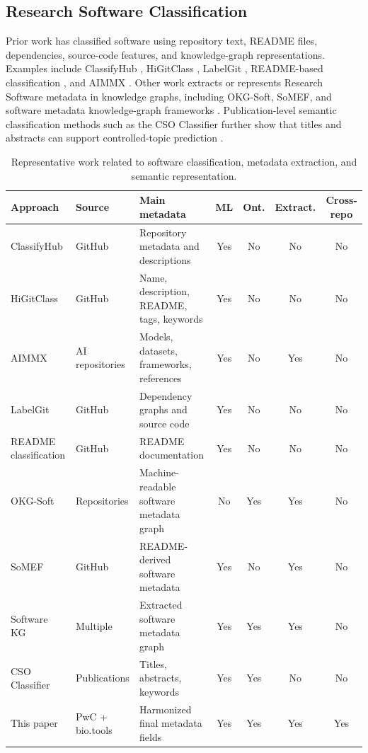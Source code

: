 \documentclass[pdflatex,sn-mathphys-num]{sn-jnl}
\theoremstyle{thmstyleone}%
\theoremstyle{thmstyletwo}%
\theoremstyle{thmstylethree}%
\begin{document}
\subsection{Research Software Classification}
\label{subsec:related-classification}

Prior work has classified software using repository text, README files, dependencies, source-code features, and knowledge-graph representations. Examples include ClassifyHub \cite{Soll2017ClassifyHub}, HiGitClass \cite{Zhang2019HiGitClass}, LabelGit \cite{Sas2021LabelGit}, README-based classification \cite{Prana2019README}, and AIMMX \cite{Tsay2020AIMMX}. Other work extracts or represents Research Software metadata in knowledge graphs, including OKG-Soft, SoMEF, and software metadata knowledge-graph frameworks \cite{Garijo2019OKGSoft,Mao2019SoMEF,Kelley2021SoftwareKG}. Publication-level semantic classification methods such as the CSO Classifier further show that titles and abstracts can support controlled-topic prediction \cite{Salatino2019CSOClassifier}.

\begin{table}[htbp]
\centering
\caption{Representative work related to software classification, metadata extraction, and semantic representation.}
\label{tab:related-work-comparison}
\small
\begin{tabularx}{\textwidth}{p{2.6cm}p{1.9cm}Ycccc}
\toprule
Approach & Source & Main metadata & ML & Ont. & Extract. & Cross-repo \\
\midrule
ClassifyHub \cite{Soll2017ClassifyHub} & GitHub & Repository metadata and descriptions & Yes & No & No & No \\
HiGitClass \cite{Zhang2019HiGitClass} & GitHub & Name, description, README, tags, keywords & Yes & No & No & No \\
AIMMX \cite{Tsay2020AIMMX} & AI repositories & Models, datasets, frameworks, references & Yes & No & Yes & No \\
LabelGit \cite{Sas2021LabelGit} & GitHub & Dependency graphs and source code & Yes & No & No & No \\
README classification \cite{Prana2019README} & GitHub & README documentation & Yes & No & No & No \\
OKG-Soft \cite{Garijo2019OKGSoft} & Repositories & Machine-readable software metadata graph & No & Yes & Yes & No \\
SoMEF \cite{Mao2019SoMEF} & GitHub & README-derived software metadata & Yes & No & Yes & No \\
Software KG \cite{Kelley2021SoftwareKG} & Multiple & Extracted software metadata graph & Yes & Yes & Yes & No \\
CSO Classifier \cite{Salatino2019CSOClassifier} & Publications & Titles, abstracts, keywords & Yes & Yes & No & No \\
\midrule
This paper & PwC + bio.tools & Harmonized final metadata fields & Yes & Yes & Yes & Yes \\
\bottomrule
\end{tabularx}
\end{table}
\end{document}
